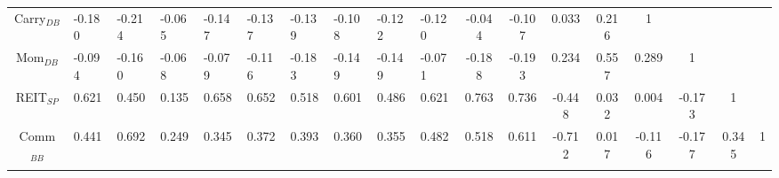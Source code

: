 \begin{adjustbox}{width=\textwidth}
\begin{tabular}{@{\extracolsep{5pt}} cHHHHHHHHHcccccccc}
Carry$_{DB}$ & -0.180 & -0.214 & -0.065 & -0.147 & -0.137 & -0.139 & -0.108 & -0.122 & -0.120 & -0.044 & -0.107 & 0.033 & 0.216 & 1 &  &  &  \\ 
Mom$_{DB}$ & -0.094 & -0.160 & -0.068 & -0.079 & -0.116 & -0.183 & -0.149 & -0.149 & -0.071 & -0.188 & -0.193 & 0.234 & 0.557 & 0.289 & 1 &  &  \\ 
REIT$_{SP}$ & 0.621 & 0.450 & 0.135 & 0.658 & 0.652 & 0.518 & 0.601 & 0.486 & 0.621 & 0.763 & 0.736 & -0.448 & 0.032 & 0.004 & -0.173 & 1 &  \\ 
Comm$_{BB}$ & 0.441 & 0.692 & 0.249 & 0.345 & 0.372 & 0.393 & 0.360 & 0.355 & 0.482 & 0.518 & 0.611 & -0.712 & 0.017 & -0.116 & -0.177 & 0.345 & 1 \\ 
\hline \\[-1.8ex] 
\end{tabular} 
\end{adjustbox}
